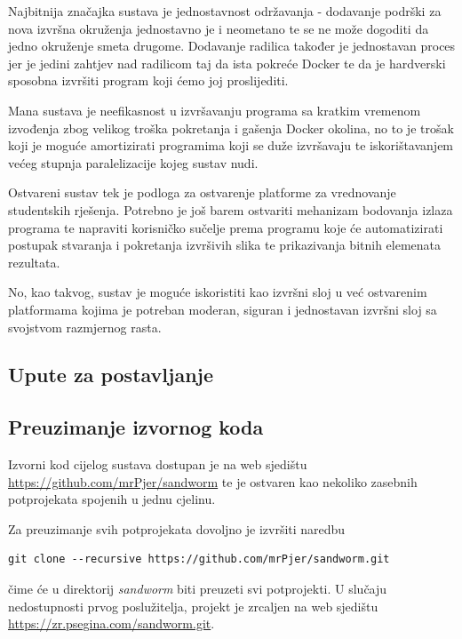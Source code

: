 \documentclass[times, utf8, zavrsni]{fer}
\begin{document}
{{{Najbitnija značajka sustava je jednostavnost održavanja - dodavanje podrški za nova izvršna okruženja jednostavno je i neometano te se ne može dogoditi da jedno okruženje smeta drugome. Dodavanje radilica također je jednostavan proces jer je jedini zahtjev nad radilicom taj da ista pokreće Docker te da je hardverski sposobna izvršiti program koji ćemo joj proslijediti.

Mana sustava je neefikasnost u izvršavanju programa sa kratkim vremenom izvođenja zbog velikog troška pokretanja i gašenja Docker okolina, no to je trošak koji je moguće amortizirati programima koji se duže izvršavaju te iskorištavanjem većeg stupnja paralelizacije kojeg sustav nudi.

Ostvareni sustav tek je podloga za ostvarenje platforme za vrednovanje studentskih rješenja. Potrebno je još barem ostvariti mehanizam bodovanja izlaza programa te napraviti korisničko sučelje prema programu koje će automatizirati postupak stvaranja i pokretanja izvršivih slika te prikazivanja bitnih elemenata rezultata.

No, kao takvog, sustav je moguće iskoristiti kao izvršni sloj u već ostvarenim platformama kojima je potreban moderan, siguran i jednostavan izvršni sloj sa svojstvom razmjernog rasta.

\begin{appendices}

\chapter{Upute za postavljanje}

\section{Preuzimanje izvornog koda}

Izvorni kod cijelog sustava dostupan je na web sjedištu {\url{https://github.com/mrPjer/sandworm}} te je ostvaren kao nekoliko zasebnih potprojekata spojenih u jednu cjelinu.

Za preuzimanje svih potprojekata dovoljno je izvršiti naredbu

\begin{lstlisting}
git clone --recursive https://github.com/mrPjer/sandworm.git
\end{lstlisting}

čime će u direktorij {\textit{sandworm}} biti preuzeti svi potprojekti. U slučaju nedostupnosti prvog poslužitelja, projekt je zrcaljen na web sjedištu {\url{https://zr.psegina.com/sandworm.git}}.


\end{appendices}}}}
\end{document}
